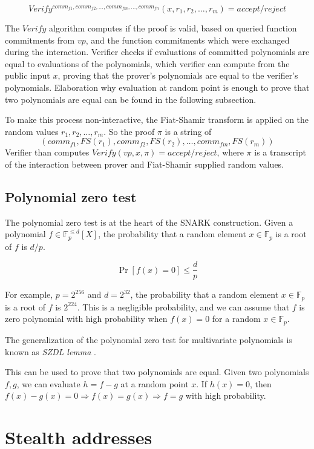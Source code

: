 \[ Verify^{comm_{f1}, comm_{f2}, \dots, comm_{fm}, \ldots, comm_{fn}}(x, r_1, r_2, \dots, r_m) = accept/reject \]\cite{SassonIOPs}

The $Verify$ algorithm computes if the proof is valid, based on queried
function commitments from $vp$, and the function commitments which were
exchanged during the interaction. Verifier checks if evaluations
of committed polynomials are equal to evaluations of the polynomials, which
verifier can compute from the public input $x$, proving that the prover's
polynomials are equal to the verifier's polynomials. Elaboration why evaluation
at random point is enough to prove that two polynomials are equal can be found
in the following subsection.

To make this process non-interactive, the Fiat-Shamir transform is applied on
the random values $r_1, r_2, \dots, r_m$. So the proof $\pi$ is a string of
\[ (comm_{f1}, FS(r_1), comm_{f2}, FS(r_2), \dots, comm_{fm}, FS(r_m)) \]
Verifier than computes $Verify(vp, x, \pi) = accept/reject$, where $\pi$ is
a transcript of the interaction between prover and Fiat-Shamir supplied random
values.

\subsection{Polynomial zero test}

The polynomial zero test is at the heart of the SNARK construction. Given a
polynomial $f \in \mathbb{F}_p^{\leq d}[X]$, the probability that a random
element $x \in \mathbb{F}_p$ is a root of $f$ is $d/p$.

\[ \Pr[f(x) = 0] \leq \frac{d}{p} \]

For example, $p = 2^{256}$ and $d = 2^{32}$, the probability that a random
element $x \in \mathbb{F}_p$ is a root of $f$ is $2^{224}$. This is a negligible
probability, and we can assume that $f$ is zero polynomial with high
probability when $f(x) = 0$ for a random $x \in \mathbb{F}_p$.

The generalization of the polynomial zero test for multivariate polynomials is
known as \textit{SZDL lemma} \cite{Schwartz1980,Zippel1979,Demillo1978}.

This can be used to prove that two polynomials are equal. Given two polynomials
$f, g$, we can evaluate $h = f - g$ at a random point $x$. If $h(x) = 0$, then
$f(x) - g(x) = 0 \Longrightarrow f(x) = g(x) \Longrightarrow f = g$ with high probability.

\section{Stealth addresses}

